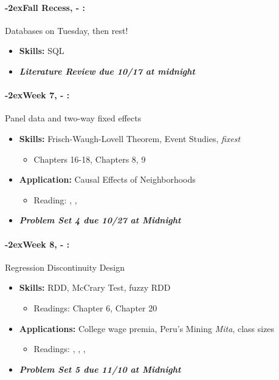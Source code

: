 \documentclass[11pt]{article}
\newcommand{\week}[1]{%
  \paragraph*{\kern-2ex\quad #1, \AdvanceDate[1]\syldate{\today} - \AdvanceDate[2]\syldate{\today}:}%
  \ifdim\wd1=\wd\MONDAY
    \AdvanceDate[7]
  \else
    \AdvanceDate[7]
  \fi%
}
\begin{document}
\week{Fall Recess} Databases on Tuesday, then rest!
\begin{itemize}
  \item \textbf{Skills:} SQL
  \item \textit{\textbf{Literature Review due 10/17 at midnight}}
\end{itemize}
\week{Week 7} Panel data and two-way fixed effects
\begin{itemize}
  \item \textbf{Skills:} Frisch-Waugh-Lovell Theorem, Event Studies, \textit{fixest}
  \begin{itemize}
    \item \cite{hungtintonklein2023effect} Chapters 16-18, \cite{cunningham2023mixtape} Chapters 8, 9
  \end{itemize}
  \item \textbf{Application:} Causal Effects of Neighborhoods
  \begin{itemize}
    \item Reading: \textbf{\cite{chetty2018neighborhoods}}, \textbf{\cite{chetty2019moving}}, \textbf{\cite{chetty2016moving}}
  \end{itemize}
  \item \textit{\textbf{Problem Set 4 due 10/27 at Midnight}}
\end{itemize}
\week{Week 8} Regression Discontinuity Design
\begin{itemize}
  \item \textbf{Skills:} RDD, McCrary Test, fuzzy RDD
  \begin{itemize}
    \item Readings: \cite{cunningham2023mixtape} Chapter 6, \cite{hungtintonklein2023effect} Chapter 20
  \end{itemize}
  \item \textbf{Applications:} College wage premia, Peru's Mining \textit{Mita}, class sizes
  \begin{itemize}
    \item Readings: \textbf{\cite{dell2010mita}}, \textbf{\cite{zimmerman2014returns}}, \textbf{\cite{angrist1999maimonides}}, \cite{chetty2023diversifying}
  \end{itemize}
  \item \textit{\textbf{Problem Set 5 due 11/10 at Midnight}}
\end{itemize}
\end{document}
